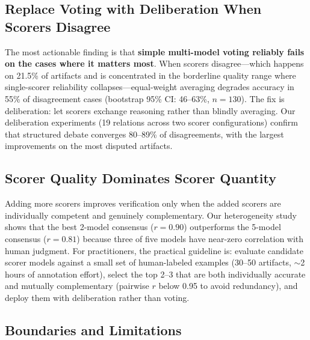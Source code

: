 \documentclass[sigconf]{acmart}
\begin{document}
\subsection{Replace Voting with Deliberation When Scorers Disagree}

The most actionable finding is that \textbf{simple multi-model voting reliably fails on the cases where it matters most}. When scorers disagree---which happens on 21.5\% of artifacts and is concentrated in the borderline quality range where single-scorer reliability collapses---equal-weight averaging degrades accuracy in 55\% of disagreement cases (bootstrap 95\% CI: 46--63\%, $n{=}130$). The fix is deliberation: let scorers exchange reasoning rather than blindly averaging. Our deliberation experiments (19 relations across two scorer configurations) confirm that structured debate converges 80--89\% of disagreements, with the largest improvements on the most disputed artifacts.

\subsection{Scorer Quality Dominates Scorer Quantity}

Adding more scorers improves verification only when the added scorers are individually competent and genuinely complementary. Our heterogeneity study shows that the best 2-model consensus ($r{=}0.90$) outperforms the 5-model consensus ($r{=}0.81$) because three of five models have near-zero correlation with human judgment. For practitioners, the practical guideline is: evaluate candidate scorer models against a small set of human-labeled examples (30--50 artifacts, $\sim$2 hours of annotation effort), select the top 2--3 that are both individually accurate and mutually complementary (pairwise $r$ below 0.95 to avoid redundancy), and deploy them with deliberation rather than voting.

\subsection{Boundaries and Limitations}
\end{document}
